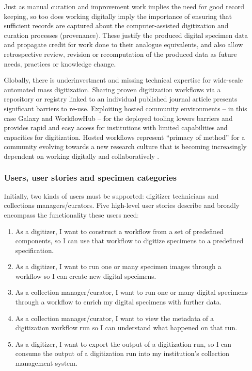 Just as manual curation and improvement work implies the need for good
record keeping, so too does working digitally imply the importance of
ensuring that sufficient records are captured about the
computer-assisted digitization and curation processes (provenance).
These justify the produced digital specimen data and propagate credit
for work done to their analogue equivalents, and also allow
retrospective review, revision or recomputation of the produced data as
future needs, practices or knowledge change.

Globally, there is underinvestment and missing technical expertise for
wide-scale automated mass digitization. Sharing proven digitization
workflows via a repository or registry linked to an individual published
journal article presents significant barriers to re-use. Exploiting
hosted community environments -- in this case Galaxy and WorkflowHub --
for the deployed tooling lowers barriers and provides rapid and easy
access for institutions with limited capabilities and capacities for
digitization. Hosted workflows represent ``primacy of method'' for a
community evolving towards a new research culture that is becoming
increasingly dependent on working digitally and collaboratively
\cite{ch8-57,ch8-58}.

\subsubsection{Users, user stories and specimen categories}\label{users-user-stories-and-specimen-categories}

Initially, two kinds of users must be supported: digitizer technicians
and collections managers/curators. Five high-level user stories describe
and broadly encompass the functionality these users need:

\begin{enumerate}
\item
  As a digitizer, I want to construct a workflow from a set of
  predefined components, so I can use that workflow to digitize
  specimens to a predefined specification.
\item
  As a digitizer, I want to run one or many specimen images through a
  workflow so I can create new digital specimens.
\item
  As a collection manager/curator, I want to run one or many digital
  specimens through a workflow to enrich my digital specimens with
  further data.
\item
  As a collection manager/curator, I want to view the metadata of a
  digitization workflow run so I can understand what happened on that
  run.
\item
  As a digitizer, I want to export the output of a digitization run, so
  I can consume the output of a digitization run into my institution's
  collection management system.
\end{enumerate}

